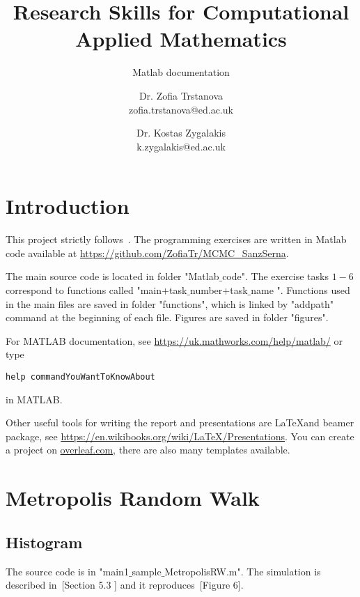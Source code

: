 \documentclass{scrartcl}
\title{Research Skills for Computational Applied Mathematics}
\subtitle{Matlab documentation}
\begin{document}
\begin{titlepage}
\author{Dr. Zofia Trstanova\\zofia.trstanova@ed.ac.uk \and Dr. Kostas Zygalakis\\ k.zygalakis@ed.ac.uk}


\clearpage\maketitle
\thispagestyle{empty}
\end{titlepage}

\newpage
\setcounter{page}{1}

\section{Introduction}
This project strictly follows~\cite{sanz2014markov}. The programming exercises are written in Matlab code available at \url{https://github.com/ZofiaTr/MCMC_SanzSerna}.

The main source code is located in folder "Matlab$\_$code". The exercise tasks $1-6$ correspond to functions called "main$+$task$\_$number$+$task$\_$name ". Functions used in the main files are saved in folder "functions", which is linked by "addpath" command at the beginning of each file. Figures are saved in folder "figures".

For MATLAB documentation, see \url{https://uk.mathworks.com/help/matlab/} or type
\begin{verbatim}
help commandYouWantToKnowAbout
\end{verbatim}
in MATLAB. 

Other useful tools for writing the report and presentations are \LaTeX and beamer package, see \url{https://en.wikibooks.org/wiki/LaTeX/Presentations}. You can create a project on \url{overleaf.com}, there are also many templates available.

\section{Metropolis Random Walk}

\subsection{Histogram}
The source code is in "main1$\_$sample$\_$MetropolisRW.m". The simulation is described in~\cite{sanz2014markov}[Section 5.3 ] and it reproduces~\cite{sanz2014markov}[Figure 6].
\end{document}
